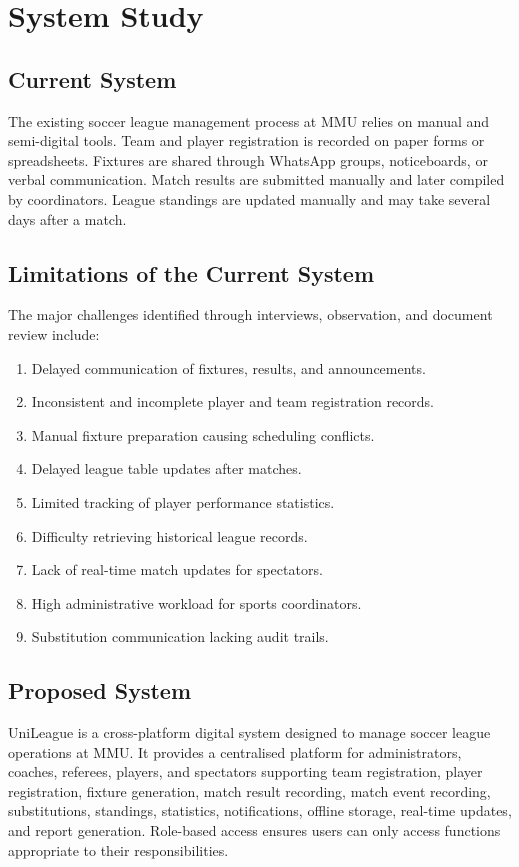 \documentclass[12pt,a4paper]{report}
\begin{document}
\section{System Study}
\subsection{Current System}
The existing soccer league management process at MMU relies on manual and semi-digital tools.
Team and player registration is recorded on paper forms or spreadsheets. Fixtures are shared
through WhatsApp groups, noticeboards, or verbal communication. Match results are submitted
manually and later compiled by coordinators. League standings are updated manually and may
take several days after a match.

\subsection{Limitations of the Current System}
The major challenges identified through interviews, observation, and document review include:
\begin{enumerate}
  \item Delayed communication of fixtures, results, and announcements.
  \item Inconsistent and incomplete player and team registration records.
  \item Manual fixture preparation causing scheduling conflicts.
  \item Delayed league table updates after matches.
  \item Limited tracking of player performance statistics.
  \item Difficulty retrieving historical league records.
  \item Lack of real-time match updates for spectators.
  \item High administrative workload for sports coordinators.
  \item Substitution communication lacking audit trails.
\end{enumerate}

\subsection{Proposed System}
UniLeague is a cross-platform digital system designed to manage soccer league operations at MMU.
It provides a centralised platform for administrators, coaches, referees, players, and spectators
supporting team registration, player registration, fixture generation, match result recording,
match event recording, substitutions, standings, statistics, notifications, offline storage,
real-time updates, and report generation. Role-based access ensures users can only access
functions appropriate to their responsibilities.
\end{document}
